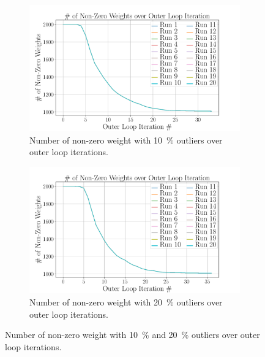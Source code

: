 \begin{figure}[!h]
	\centering
	\begin{subfigure}[b]{0.48\textwidth}
		\centering
		\includegraphics[width=\textwidth]{chapters/2-pose-estimation/fig/GNC-TLS-w-run-10-conv.pdf}
		\caption{Number of non-zero weight with \SI{10}{\percent} outliers over outer loop iterations.}
		\label{app:GNC-TLS-w-run-10-conv}
	\end{subfigure}
	\hfill
	\begin{subfigure}[b]{0.48\textwidth}
		\centering
		\includegraphics[width=\textwidth]{chapters/2-pose-estimation/fig/GNC-TLS-w-run-20-conv.pdf}
		\caption{Number of non-zero weight with \SI{20}{\percent} outliers over outer loop iterations.}
		\label{app:GNC-TLS-w-run-20-conv}
	\end{subfigure}
	\caption{Number of non-zero weight with \SI{10}{\percent} and \SI{20}{\percent} outliers over outer loop iterations.}
	\label{app:GNC-TLS-w-run-10-20-conv}
\end{figure}
